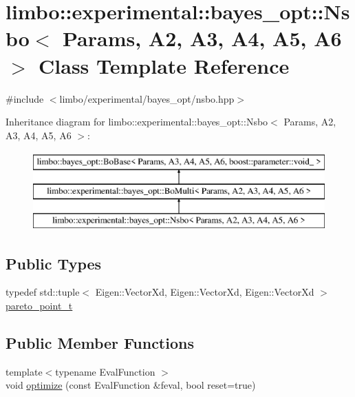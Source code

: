 \hypertarget{classlimbo_1_1experimental_1_1bayes__opt_1_1_nsbo}{}\section{limbo\+:\+:experimental\+:\+:bayes\+\_\+opt\+:\+:Nsbo$<$ Params, A2, A3, A4, A5, A6 $>$ Class Template Reference}
\label{classlimbo_1_1experimental_1_1bayes__opt_1_1_nsbo}


{\ttfamily \#include $<$limbo/experimental/bayes\+\_\+opt/nsbo.\+hpp$>$}

Inheritance diagram for limbo\+:\+:experimental\+:\+:bayes\+\_\+opt\+:\+:Nsbo$<$ Params, A2, A3, A4, A5, A6 $>$\+:\begin{figure}[H]
\begin{center}
\leavevmode
\includegraphics[height=3.000000cm]{classlimbo_1_1experimental_1_1bayes__opt_1_1_nsbo}
\end{center}
\end{figure}
\subsection*{Public Types}
\begin{DoxyCompactItemize}
\item 
typedef std\+::tuple$<$ Eigen\+::\+Vector\+Xd, Eigen\+::\+Vector\+Xd, Eigen\+::\+Vector\+Xd $>$ \hyperlink{classlimbo_1_1experimental_1_1bayes__opt_1_1_nsbo_a3e81d90b45461a23fe86554370a0423e}{pareto\+\_\+point\+\_\+t}
\end{DoxyCompactItemize}
\subsection*{Public Member Functions}
\begin{DoxyCompactItemize}
\item 
{\footnotesize template$<$typename Eval\+Function $>$ }\\void \hyperlink{classlimbo_1_1experimental_1_1bayes__opt_1_1_nsbo_a58cae8a4e4902070ef05e9320604805f}{optimize} (const Eval\+Function \&feval, bool reset=true)
\end{DoxyCompactItemize}


